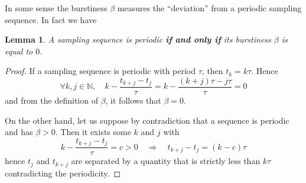 \documentclass[12pt,draftcls,onecolumn]{IEEEtran} %
\newtheorem{lemma}{Lemma}
\newcommand{\NN}{\mathbb{N}}
\begin{document}
In some sense the burstiness $\beta$ measures the ``deviation'' from a
periodic sampling sequence. In fact we have
\begin{lemma}
  A sampling sequence is periodic \textbf{if and only if} its
  burstiness $\beta$ is equal to $0$.
\end{lemma}
\begin{proof}
  If a sampling sequence is periodic with period $\tau$, then
  $t_k=k\tau$. Hence
  \begin{equation*}
    \forall k,j\in\NN,\quad k-\frac{t_{k+j}-t_j}\tau= k-\frac{(k+j)\tau -j\tau}\tau = 0
  \end{equation*}
  and from the definition of $\beta$, it follows that $\beta=0$.

  On the other hand, let us suppose by contradiction that a sequence is
  periodic and has $\beta>0$. Then it exists some $k$ and $j$ with
  \begin{equation*}
    k-\frac{t_{k+j}-t_j}\tau = c>0
    \quad\Rightarrow\quad
    t_{k+j}-t_j = (k-c)\tau
  \end{equation*}
  hence $t_j$ and $t_{k+j}$ are separated by a quantity that is
  strictly less than $k\tau$ contradicting the periodicity.
\end{proof}





\end{document}

